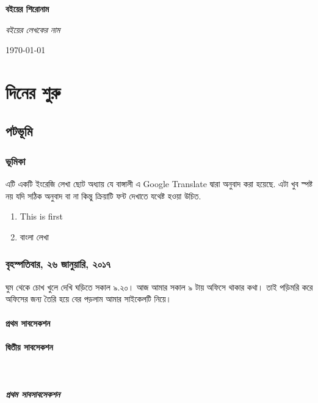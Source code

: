 \documentclass[12pt]{report}
\begin{document}
\begin{titlepage}
	\centering
	\vspace{1.5cm}
	{\huge\bfseries বইয়ের শিরোনাম \par}
	\vspace{1.25cm}
	{\Large\itshape বইয়ের লেখকের নাম \par}
	\vfill

	{\large \today\par}
\end{titlepage}

\tableofcontents

\part{দিনের শুরু}
\chapter{পটভূমি}
\section{ভূমিকা}
এটি একটি ইংরেজি লেখা ছোট অধ্যায় যে বাঙ্গালী এ \textenglish{Google Translate} দ্বারা অনুবাদ করা হয়েছে. এটা খুব স্পষ্ট নয় যদি সঠিক অনুবাদ বা না কিন্তু ক্রিয়াটি ফন্ট দেখাতে যথেষ্ট হওয়া উচিত.

\begin{enumerate}
    \item   \foreignlanguage{english}{This is first}
    \item   বাংলা লেখা
\end{enumerate}

\section{বৃহস্পতিবার, ২৬ জানুয়ারি, ২০১৭}
ঘুম থেকে চোখ খুলে দেখি ঘড়িতে সকাল ৯.২০। আজ আমার সকাল ৯ টায় অফিসে থাকার কথা। তাই পড়িমরি করে অফিসের জন্য তৈরি হয়ে বের পড়লাম আমার সাইকেলটি নিয়ে।

\subsection{প্রথম সাবসেকশন}
\subsection{দ্বিতীয় সাবসেকশন}
‌‌\subsubsection{প্রথম সাবসাবসেকশন}
\end{document}
